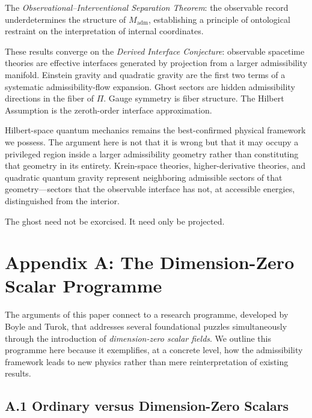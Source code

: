 \documentclass[12pt,a4paper]{article}
\theoremstyle{remark}
\begin{document}
The \emph{Observational--Interventional Separation Theorem}: the observable
record underdetermines the structure of $M_{\mathrm{adm}}$, establishing a
principle of ontological restraint on the interpretation of internal
coordinates.

These results converge on the \emph{Derived Interface Conjecture}: observable
spacetime theories are effective interfaces generated by projection from a
larger admissibility manifold. Einstein gravity and quadratic gravity are
the first two terms of a systematic admissibility-flow expansion. Ghost
sectors are hidden admissibility directions in the fiber of $\Pi$. Gauge
symmetry is fiber structure. The Hilbert Assumption is the zeroth-order
interface approximation.

Hilbert-space quantum mechanics remains the best-confirmed physical
framework we possess. The argument here is not that it is wrong but that
it may occupy a privileged region inside a larger admissibility geometry
rather than constituting that geometry in its entirety. Krein-space
theories, higher-derivative theories, and quadratic quantum gravity represent
neighboring admissible sectors of that geometry---sectors that the observable
interface has not, at accessible energies, distinguished from the interior.

The ghost need not be exorcised. It need only be projected.

\bigskip


\section*{Appendix A: The Dimension-Zero Scalar Programme}

The arguments of this paper connect to a research programme, developed by Boyle and Turok, that
addresses several foundational puzzles simultaneously through the introduction of \emph{dimension-zero
scalar fields}. We outline this programme here because it exemplifies, at a concrete level, how the
admissibility framework leads to new physics rather than mere reinterpretation of existing results.

\subsection*{A.1 Ordinary versus Dimension-Zero Scalars}
\end{document}
